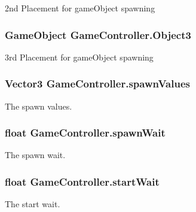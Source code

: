 2nd Placement for game\-Object spawning 

\hypertarget{classGameController_a9956f5a361f097e051a144a2b787e5ca}{
\subsubsection[{Object3}]{\setlength{\rightskip}{0pt plus 5cm}Game\-Object Game\-Controller.\-Object3}}\label{classGameController_a9956f5a361f097e051a144a2b787e5ca}


3rd Placement for game\-Object spawning 

\hypertarget{classGameController_a5e4f56c23896d4b528da579f93335896}{
\subsubsection[{spawn\-Values}]{\setlength{\rightskip}{0pt plus 5cm}Vector3 Game\-Controller.\-spawn\-Values}}\label{classGameController_a5e4f56c23896d4b528da579f93335896}


The spawn values. 

\hypertarget{classGameController_a27c91a14de3982813ad3d8245d0134d7}{
\subsubsection[{spawn\-Wait}]{\setlength{\rightskip}{0pt plus 5cm}float Game\-Controller.\-spawn\-Wait}}\label{classGameController_a27c91a14de3982813ad3d8245d0134d7}


The spawn wait. 

\hypertarget{classGameController_a9b6f96c29d3ee0f2c692c30ed2b12835}{
\subsubsection[{start\-Wait}]{\setlength{\rightskip}{0pt plus 5cm}float Game\-Controller.\-start\-Wait}}\label{classGameController_a9b6f96c29d3ee0f2c692c30ed2b12835}


The start wait. 

